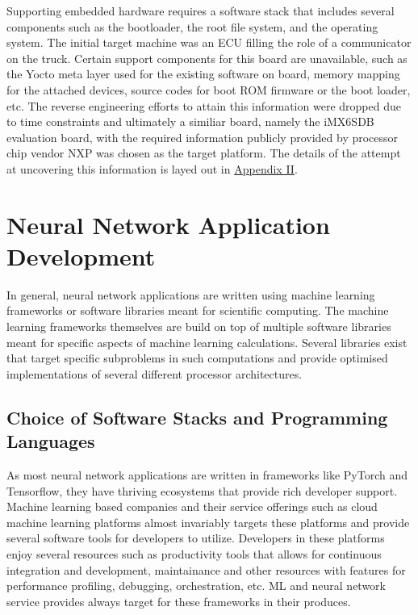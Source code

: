 Supporting embedded hardware requires a software stack that includes several components such as the bootloader, the root file system, and the operating system. The initial target machine was an ECU filling the role of a communicator on the truck. Certain support components for this board are unavailable, such as the Yocto meta layer used for the existing software on board, memory mapping for the attached devices, source codes for boot ROM firmware or the boot loader, etc. The reverse engineering efforts to attain this information were dropped due to time constraints and ultimately a similiar board, namely the iMX6SDB evaluation board, with the required information publicly provided by processor chip vendor NXP was chosen as the target platform. The details of the attempt at uncovering this information is layed out in \hyperref[rtc-c300]{Appendix II}.

\section{Neural Network Application Development}

In general, neural network applications are written using machine learning frameworks or software libraries meant for scientific computing. The machine learning frameworks themselves are build on top of multiple software libraries meant for specific aspects of machine learning calculations. Several libraries exist that target specific subproblems in such computations and provide optimised implementations of several different processor architectures.

\subsection{Choice of Software Stacks and Programming Languages}

As most neural network applications are written in frameworks like PyTorch and Tensorflow, they have thriving ecosystems that provide rich developer support. Machine learning based companies and their service offerings such as cloud machine learning platforms almost invariably targets these platforms and provide several software tools for developers to utilize. Developers in these platforms enjoy several resources such as productivity tools that allows for continuous integration and development, maintainance and other resources with features for performance profiling, debugging, orchestration, etc. ML and neural network service provides always target for these frameworks in their produces.


